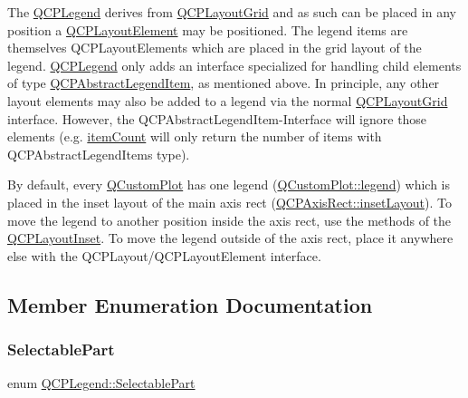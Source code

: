 The \mbox{\hyperlink{class_q_c_p_legend}{Q\+C\+P\+Legend}} derives from \mbox{\hyperlink{class_q_c_p_layout_grid}{Q\+C\+P\+Layout\+Grid}} and as such can be placed in any position a \mbox{\hyperlink{class_q_c_p_layout_element}{Q\+C\+P\+Layout\+Element}} may be positioned. The legend items are themselves Q\+C\+P\+Layout\+Elements which are placed in the grid layout of the legend. \mbox{\hyperlink{class_q_c_p_legend}{Q\+C\+P\+Legend}} only adds an interface specialized for handling child elements of type \mbox{\hyperlink{class_q_c_p_abstract_legend_item}{Q\+C\+P\+Abstract\+Legend\+Item}}, as mentioned above. In principle, any other layout elements may also be added to a legend via the normal \mbox{\hyperlink{class_q_c_p_layout_grid}{Q\+C\+P\+Layout\+Grid}} interface. However, the Q\+C\+P\+Abstract\+Legend\+Item-\/\+Interface will ignore those elements (e.\+g. \mbox{\hyperlink{class_q_c_p_legend_a57ab86ab8b2a3762d4c1455eb5452c88}{item\+Count}} will only return the number of items with Q\+C\+P\+Abstract\+Legend\+Items type).

By default, every \mbox{\hyperlink{class_q_custom_plot}{Q\+Custom\+Plot}} has one legend (\mbox{\hyperlink{class_q_custom_plot_a4eadcd237dc6a09938b68b16877fa6af}{Q\+Custom\+Plot\+::legend}}) which is placed in the inset layout of the main axis rect (\mbox{\hyperlink{class_q_c_p_axis_rect_a949f803466619924c7018df4b511ae10}{Q\+C\+P\+Axis\+Rect\+::inset\+Layout}}). To move the legend to another position inside the axis rect, use the methods of the \mbox{\hyperlink{class_q_c_p_layout_inset}{Q\+C\+P\+Layout\+Inset}}. To move the legend outside of the axis rect, place it anywhere else with the Q\+C\+P\+Layout/\+Q\+C\+P\+Layout\+Element interface. 

\subsection{Member Enumeration Documentation}
\mbox{\label{class_q_c_p_legend_a5404de8bc1e4a994ca4ae69e2c7072f1}} 
\subsubsection{\texorpdfstring{Selectable\+Part}{SelectablePart}}
{\footnotesize\ttfamily enum \mbox{\hyperlink{class_q_c_p_legend_a5404de8bc1e4a994ca4ae69e2c7072f1}{Q\+C\+P\+Legend\+::\+Selectable\+Part}}}

